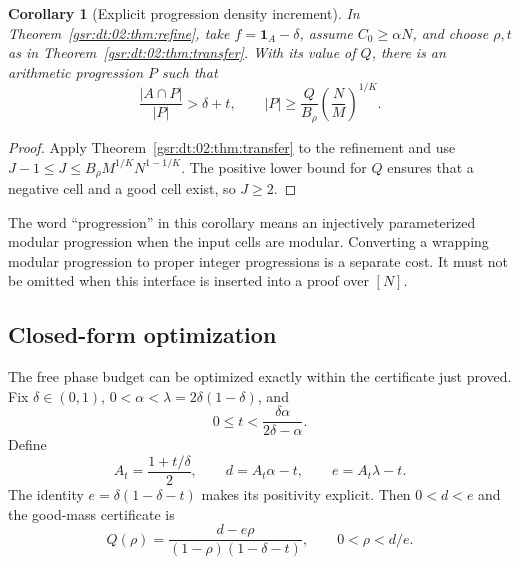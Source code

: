 \documentclass[11pt,letterpaper]{article}
\numberwithin{equation}{section}
\newtheorem{corollary}[theorem]{Corollary}
\theoremstyle{definition}
\theoremstyle{remark}
\newcommand{\one}{\mathbf 1}
\newcommand{\1}{\mathbf 1}
\begin{document}
\begin{corollary}[Explicit progression density increment]\label{gsr:dt:02:cor:progression}
In Theorem~\ref{gsr:dt:02:thm:refine}, take $f=\one_A-\delta$, assume $C_0\geq\alpha N$, and choose $\rho,t$ as in Theorem~\ref{gsr:dt:02:thm:transfer}. With its value of $Q$, there is an arithmetic progression $P$ such that
\begin{equation}\label{gsr:dt:02:eq:finalprogression}
 \frac{|A\cap P|}{|P|}>\delta+t,\qquad
 |P|\geq\frac{Q}{B_\rho}\left(\frac NM\right)^{1/K}.
\end{equation}
\end{corollary}
\begin{proof}
Apply Theorem~\ref{gsr:dt:02:thm:transfer} to the refinement and use $J-1\leq J\leq B_\rho M^{1/K}N^{1-1/K}$. The positive lower bound for $Q$ ensures that a negative cell and a good cell exist, so $J\geq2$.
\end{proof}

The word ``progression'' in this corollary means an injectively parameterized modular progression when the input cells are modular. Converting a wrapping modular progression to proper integer progressions is a separate cost. It must not be omitted when this interface is inserted into a proof over $[N]$.

\subsection{Closed-form optimization}
The free phase budget can be optimized exactly within the certificate just proved. Fix $\delta\in(0,1)$, $0<\alpha<\lambda=2\delta(1-\delta)$, and
\[
 0\leq t<\frac{\delta\alpha}{2\delta-\alpha}.
\]
Define
\begin{equation}\label{gsr:dt:02:eq:de}
 A_t=\frac{1+t/\delta}{2},\qquad
 d=A_t\alpha-t,\qquad e=A_t\lambda-t.
\end{equation}
The identity $e=\delta(1-\delta-t)$ makes its positivity explicit. Then $0<d<e$ and the good-mass certificate is
\[
 Q(\rho)=\frac{d-e\rho}{(1-\rho)(1-\delta-t)},
 \qquad 0<\rho<d/e.
\]
\end{document}

